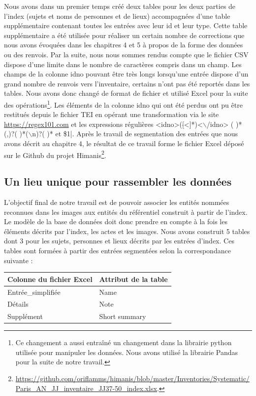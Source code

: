 \documentclass[a4paper,12pt,twoside]{book}
\begin{document}
	Nous avons dans un premier temps créé deux tables pour les deux parties de l'index (sujets et noms de personnes et de lieux) accompagnées d'une table supplémentaire contenant toutes les entrées avec leur id et leur type. Cette table supplémentaire a été utilisée pour réaliser un certain nombre de corrections que nous avons évoquées dans les chapitres 4 et 5 à propos de la forme des données ou des renvois. Par la suite, nous nous sommes rendus compte que le fichier CSV dispose d'une limite dans le nombre de caractères compris dans un champ. Les champs de la colonne \og idno\fg{} pouvant être très longs lorsqu'une entrée dispose d'un grand nombre de renvois vers l'inventaire, certains n'ont pas été reportés dans les tables. Nous avons donc changé de format de fichier et utilisé Excel pour la suite des opérations\footnote{Ce changement a aussi entraîné un changement dans la librairie python utilisée pour manipuler les données. Nous avons utilisé la librairie Pandas pour la suite de notre travail.}. Les éléments de la colonne \og idno\fg{} qui ont été perdus ont pu être restitués depuis le fichier TEI en opérant une transformation via le site \url{https://regex101.com} et les expressions régulières \og <idno>([$\hat{}$<]*)<$\backslash$/idno> ( )*(,)?( )*($\backslash$n)?( )* \fg{} et \og \$1|\fg{}. Après le travail de segmentation des entrées que nous avons décrit au chapitre 4, le résultat de ce travail forme le fichier Excel déposé sur le Github du projet Himanis\footnote{\url{https://github.com/oriflamms/himanis/blob/master/Inventories/Systematic/Paris_AN_JJ_inventaire_JJ37-50_index.xlsx}.}.
	
	\subsection{Un lieu unique pour rassembler les données}
	
	L'objectif final de notre travail est de pouvoir associer les entités nommées reconnues dans les images aux entités du référentiel construit à partir de l'index. Le modèle de la base de données doit donc prendre en compte à la fois les éléments décrits par l'index, les actes et les images. Nous avons construit 5 tables dont 3 pour les sujets, personnes et lieux décrits par les entrées d'index. Ces tables sont formées à partir des entrées segmentées selon la correspondance suivante :
	
	\begin{center}
		\begin{tabular}{|p{5cm}|p{5cm}|}
			\hline
			Colonne du fichier Excel & Attribut de la table \\ \hline \hline
			Entrée\_simplifiée & Name \\ \hline
			Détails & Note \\ \hline
			Supplément & Short summary \\ \hline
		\end{tabular}
	\end{center}
	
\end{document}
